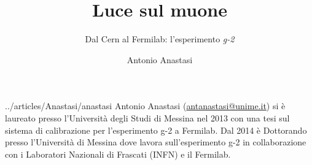 ﻿\title{Luce sul muone}
\subtitle{Dal Cern al Fermilab: l'esperimento \emph{g-2}}
\suptitle{\phantom{x}}
\author{Antonio Anastasi}
\maketitle
\begin{small}
\pichskip{4mm}
\nobalance



\vfill
\begin{thebiography}{../articles/Anastasi/anastasi}
Antonio Anastasi (\url{antanastasi@unime.it}) si è
laureato presso l'Università degli Studi di Messina nel 2013 con una tesi
sul sistema di calibrazione per l'esperimento g-2 a Fermilab. Dal 2014 è
Dottorando presso l'Università di Messina dove lavora sull'esperimento g-2
in collaborazione con i Laboratori Nazionali di Frascati (INFN) e il
Fermilab.
\end{thebiography}
\end{small}

